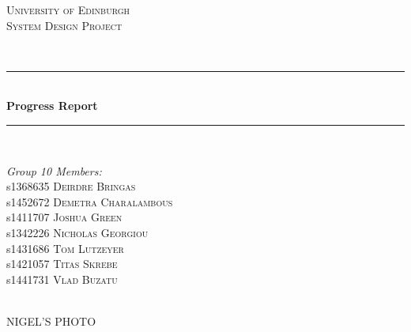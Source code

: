 \documentclass{article}
\begin{document}
\begin{titlepage}

\newcommand{\HRule}{\rule{\linewidth}{0.5mm}} %

\center %
\textsc{\LARGE University of Edinburgh}\\[1.5cm] %
\textsc{\Large System Design Project}\\[0.5cm] %
\date{January 2017}
\textsc{\large }\\[0.5cm] %
\HRule \\[0.4cm]
{ \huge \bfseries Progress Report}\\[0.4cm] %
\HRule \\[1.5cm]
\begin{minipage}{0.7\textwidth}
\begin{flushleft} \large
\emph{Group 10 Members:}\\
s1368635 \textsc{Deirdre Bringas}
\\s1452672 \textsc{Demetra Charalambous}
\\s1411707 \textsc{Joshua Green}
\\s1342226 \textsc{Nicholas Georgiou}
\\s1431686 \textsc{Tom Lutzeyer}
\\s1421057 \textsc{Titas Skrebe}
\\s1441731 \textsc{Vlad Buzatu}
\end{flushleft}
\end{minipage}\\[4cm]
\textsc{\Large NIGEL'S PHOTO}\\[0.5cm] 

\end{titlepage}

\newpage
\end{document}
